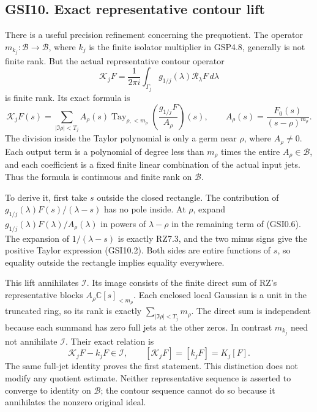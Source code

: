 \subsection{GSI10. Exact representative contour
lift}\label{gsi10.-exact-representative-contour-lift}

There is a useful precision refinement concerning the prequotient. The
operator \(m_{k_j}:\mathcal B\to\mathcal B\), where \(k_j\) is the
finite isolator multiplier in GSP4.8, generally is not finite rank. But
the actual representative contour operator \[
\mathscr K_jF=\frac1{2\pi i}\int_{\Gamma_j}
g_{1/j}(\lambda)\mathscr R_\lambda F\,d\lambda
\tag{GSI10.1}
\] is finite rank. Its exact formula is \[
\mathscr K_jF(s)=\sum_{|\Im\rho|<T_j}
A_\rho(s)\operatorname{Tay}_{\rho,<m_\rho}
\left(\frac{g_{1/j}F}{A_\rho}\right)(s),
\qquad A_\rho(s)=\frac{F_0(s)}{(s-\rho)^{m_\rho}}.
\tag{GSI10.2}
\] The division inside the Taylor polynomial is only a germ near
\(\rho\), where \(A_\rho\ne0\). Each output term is a polynomial of
degree less than \(m_\rho\) times the entire \(A_\rho\in\mathcal B\),
and each coefficient is a fixed finite linear combination of the actual
input jets. Thus the formula is continuous and finite rank on
\(\mathcal B\).

To derive it, first take \(s\) outside the closed rectangle. The
contribution of \(g_{1/j}(\lambda)F(s)/(\lambda-s)\) has no pole inside.
At \(\rho\), expand \(g_{1/j}(\lambda)F(\lambda)/A_\rho(\lambda)\) in
powers of \(\lambda-\rho\) in the remaining term of (GSI0.6). The
expansion of \(1/(\lambda-s)\) is exactly RZ7.3, and the two minus signs
give the positive Taylor expression (GSI10.2). Both sides are entire
functions of \(s\), so equality outside the rectangle implies equality
everywhere.

This lift annihilates \(\mathcal I\). Its image consists of the finite
direct sum of RZ's representative blocks
\(A_\rho\mathbb C[s]_{<m_\rho}\). Each enclosed local Gaussian is a unit
in the truncated ring, so its rank is exactly
\(\sum_{|\Im\rho|<T_j}m_\rho\). The direct sum is independent because
each summand has zero full jets at the other zeros. In contrast
\(m_{k_j}\) need not annihilate \(\mathcal I\). Their exact relation is
\[
\mathscr K_jF-k_jF\in\mathcal I,
\qquad [\mathscr K_jF]=[k_jF]=K_j[F].
\tag{GSI10.3}
\] The same full-jet identity proves the first statement. This
distinction does not modify any quotient estimate. Neither
representative sequence is asserted to converge to identity on
\(\mathcal B\); the contour sequence cannot do so because it annihilates
the nonzero original ideal.

